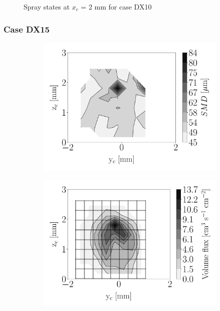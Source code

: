 \begin{figure}[h!]
\begin{subfigure}[b]{0.3\textwidth}
\end{subfigure}
\caption{Spray states at $x_c$ = 2 mm for case DX10}
\label{fig:injectors_sli_BIMER_DX10_xD06p67}
\end{figure}



\subsubsection*{Case DX15}





\begin{figure}[h!]
\centering
\begin{subfigure}[b]{0.3\textwidth}
	\centering
   \includegraphics[scale=\scaleSLIBIMER]{./part3_applications/figures_ch8_resolved/injectors_SLI/dx15_xD05p00_SMD_map}
\end{subfigure}
   \hspace{0.17in}
\begin{subfigure}[b]{0.3\textwidth}
	\centering
   \includegraphics[scale=\scaleSLIBIMER]{./part3_applications/figures_ch8_resolved/injectors_SLI/dx15_xD05p00_volume_flux_map}

\end{subfigure}
\end{figure}

